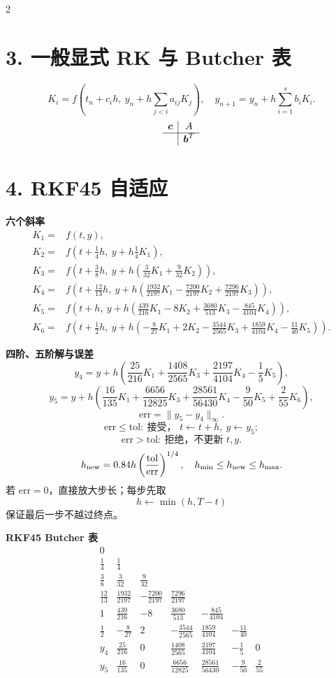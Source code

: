 \documentclass[10pt,a4paper]{ctexart}
\begin{document}
\begin{multicols}{2}
\section*{3. 一般显式 RK 与 Butcher 表}
\[
K_i=f\left(t_n+c_i h,\ y_n+h\sum_{j<i}a_{ij}K_j\right),
\quad
y_{n+1}=y_n+h\sum_{i=1}^s b_iK_i.
\]
\[
\begin{array}{c|c}
\boldsymbol c&A\\ \hline
&\boldsymbol b^T
\end{array}
\]

\section*{4. RKF45 自适应}
\textbf{六个斜率}
\[
\begin{aligned}
K_1={}&f(t,y),\\
K_2={}&f(t+\tfrac14h,\ y+h\tfrac14K_1),\\
K_3={}&f(t+\tfrac38h,\ y+h(\tfrac3{32}K_1+\tfrac9{32}K_2)),\\
K_4={}&f(t+\tfrac{12}{13}h,\ y+h(\tfrac{1932}{2197}K_1-\tfrac{7200}{2197}K_2+\tfrac{7296}{2197}K_3)),\\
K_5={}&f(t+h,\ y+h(\tfrac{439}{216}K_1-8K_2+\tfrac{3680}{513}K_3-\tfrac{845}{4104}K_4)),\\
K_6={}&f(t+\tfrac12h,\ y+h(-\tfrac8{27}K_1+2K_2-\tfrac{3544}{2565}K_3+\tfrac{1859}{4104}K_4-\tfrac{11}{40}K_5)).
\end{aligned}
\]

\textbf{四阶、五阶解与误差}
\[
y_4=y+h\left(\frac{25}{216}K_1+\frac{1408}{2565}K_3+
\frac{2197}{4104}K_4-\frac15K_5\right),
\]
\[
y_5=y+h\left(\frac{16}{135}K_1+\frac{6656}{12825}K_3+
\frac{28561}{56430}K_4-\frac9{50}K_5+\frac2{55}K_6\right),
\]
\[
\mathrm{err}=\|y_5-y_4\|_\infty.
\]
\[
\mathrm{err}\leq\mathrm{tol}:\ \text{接受， }t\leftarrow t+h,\ y\leftarrow y_5;
\]
\[
\mathrm{err}>\mathrm{tol}:\ \text{拒绝，不更新 }t,y.
\]
\[
h_{\rm new}=0.84h\left(\frac{\mathrm{tol}}{\mathrm{err}}\right)^{1/4},
\quad h_{\min}\leq h_{\rm new}\leq h_{\max}.
\]
若 $\mathrm{err}=0$，直接放大步长；每步先取
\[
h\leftarrow\min(h,T-t)
\]
保证最后一步不越过终点。

\textbf{RKF45 Butcher 表}
\[
\renewcommand{\arraystretch}{1.15}
\begin{array}{c|rrrrrr}
0\\
\frac14&\frac14\\
\frac38&\frac3{32}&\frac9{32}\\
\frac{12}{13}&\frac{1932}{2197}&-\frac{7200}{2197}&\frac{7296}{2197}\\
1&\frac{439}{216}&-8&\frac{3680}{513}&-\frac{845}{4104}\\
\frac12&-\frac8{27}&2&-\frac{3544}{2565}&\frac{1859}{4104}&-\frac{11}{40}\\ \hline
y_4&\frac{25}{216}&0&\frac{1408}{2565}&\frac{2197}{4104}&-\frac15&0\\
y_5&\frac{16}{135}&0&\frac{6656}{12825}&\frac{28561}{56430}&-\frac9{50}&\frac2{55}
\end{array}
\]


\end{multicols}
\end{document}
